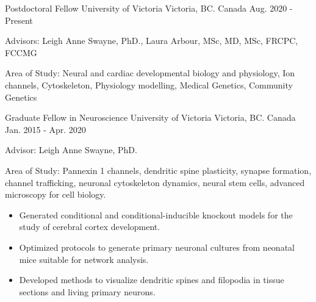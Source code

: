

\begin{cventries}

  \cventry
    {Postdoctoral Fellow} %
    {University of Victoria} %
    {Victoria, BC. Canada} %
    {Aug. 2020 - Present} %
    {
      \begin{cvitems} %
        \item {Advisors: Leigh Anne Swayne, PhD., Laura Arbour, MSc, MD, MSc, FRCPC, FCCMG}
        \item {Area of Study: Neural and cardiac developmental biology and physiology, Ion channels, Cytoskeleton, Physiology modelling, Medical Genetics, Community Genetics}
      \end{cvitems}
    }
  \cventry
    {Graduate Fellow in Neuroscience} %
    {University of Victoria} %
    {Victoria, BC. Canada} %
    {Jan. 2015 - Apr. 2020} %
    {
      \begin{cvitems} %
        \item {Advisor: Leigh Anne Swayne, PhD.}
        \item {Area of Study: Pannexin 1 channels, dendritic spine plasticity, synapse formation, channel trafficking, neuronal cytoskeleton dynamics, neural stem cells, advanced microscopy for cell biology.}
        \begin{itemize}
          \begin{itemize}
            \item {Generated conditional and conditional-inducible knockout models for the study of cerebral cortex development.}
            \item {Optimized protocols to generate primary neuronal cultures from neonatal mice suitable for network analysis.}
            \item {Developed methods to visualize dendritic spines and filopodia in tissue sections and living primary neurons.}

\end{itemize}
\end{itemize}
\end{cvitems}}
\end{cventries}
